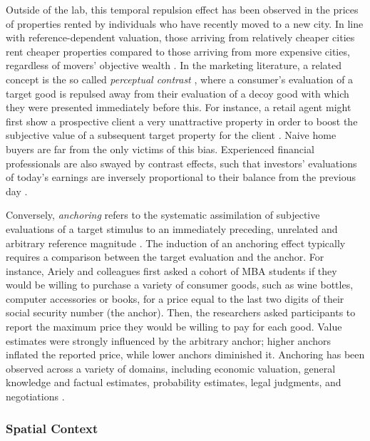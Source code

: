 \documentclass[a4paper, nobind]{templates/ociamthesis}
\begin{document}
Outside of the lab, this temporal repulsion effect has been observed in the prices of properties rented by individuals who have recently moved to a new city. In line with reference-dependent valuation, those arriving from relatively cheaper cities rent cheaper properties compared to those arriving from more expensive cities, regardless of movers' objective wealth \autocite{simonsohn2006}. In the marketing literature, a related concept is the so called \emph{perceptual contrast} \autocite{lynchjr.1991,tormala2007,lee2010}, where a consumer's evaluation of a target good is repulsed away from their evaluation of a decoy good with which they were presented immediately before this. For instance, a retail agent might first show a prospective client a very unattractive property in order to boost the subjective value of a subsequent target property for the client \autocite{cialdini1987}. Naive home buyers are far from the only victims of this bias. Experienced financial professionals are also swayed by contrast effects, such that investors' evaluations of today's earnings are inversely proportional to their balance from the previous day \autocite{hartzmark2018}.

Conversely, \emph{anchoring} refers to the systematic assimilation of subjective evaluations of a target stimulus to an immediately preceding, unrelated and arbitrary reference magnitude \autocite{tversky1974}. The induction of an anchoring effect typically requires a comparison between the target evaluation and the anchor. For instance, Ariely and colleagues \autocite*{ariely2003} first asked a cohort of MBA students if they would be willing to purchase a variety of consumer goods, such as wine bottles, computer accessories or books, for a price equal to the last two digits of their social security number (the anchor). Then, the researchers asked participants to report the maximum price they would be willing to pay for each good. Value estimates were strongly influenced by the arbitrary anchor; higher anchors inflated the reported price, while lower anchors diminished it. Anchoring has been observed across a variety of domains, including economic valuation, general knowledge and factual estimates, probability estimates, legal judgments, and negotiations \autocite{furnham2011}.

\hypertarget{spatial-context-1}{%
\subsubsection{Spatial Context}\label{spatial-context-1}}
\end{document}
